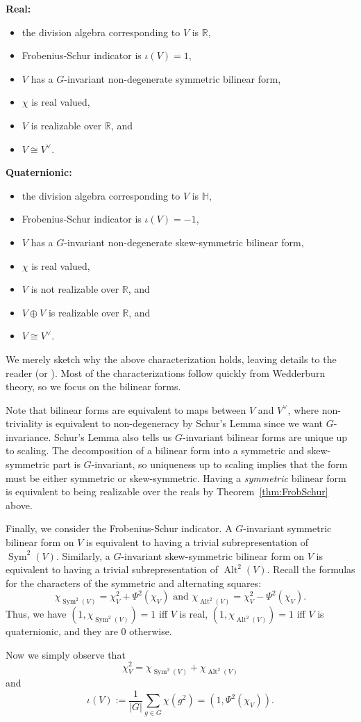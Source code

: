 \documentclass[12pt]{article}
\theoremstyle{plain}
\theoremstyle{definition}
\theoremstyle{remark}
\numberwithin{equation}{section}
\begin{document}
\noindent
\textbf{Real:}
\begin{itemize}
\item the division algebra corresponding to $V$ is $\mathbb{R}$,
\item Frobenius-Schur indicator is $\iota(V)=1$,
\item $V$ has a $G$-invariant non-degenerate symmetric bilinear form,
\item $\chi$ is real valued,
\item $V$ is realizable over $\mathbb{R}$, and
\item $V \cong V^\vee$.
\end{itemize}

\noindent
\textbf{Quaternionic:}
\begin{itemize}
\item the division algebra corresponding to $V$ is $\mathbb{H}$,
\item Frobenius-Schur indicator is $\iota(V)=-1$,
\item $V$ has a $G$-invariant non-degenerate skew-symmetric bilinear form,
\item $\chi$ is real valued,
\item $V$ is not realizable over $\mathbb{R}$, and
\item $V \oplus V$ is realizable over $\mathbb{R}$, and
\item $V \cong V^\vee$.
\end{itemize}

We merely sketch why the above characterization holds,
leaving details to the reader (or \cite[\S{13.2}]{Serre}).
Most of the characterizations follow quickly from Wedderburn theory,
so we focus on the bilinear forms.

Note that bilinear forms are equivalent to maps between $V$ and
$V^\vee$, where non-triviality is equivalent to non-degeneracy by
Schur's Lemma since we want $G$-invariance.
Schur's Lemma also tells us $G$-invariant bilinear forms
are unique up to scaling.
The decomposition of a bilinear form into a symmetric and skew-symmetric
part is $G$-invariant, so uniqueness up to scaling implies that the form
must be either symmetric or skew-symmetric.
Having a \emph{symmetric} bilinear form is equivalent to being realizable over
the reals by Theorem~\ref{thm:FrobSchur} above.

Finally, we consider the Frobenius-Schur indicator.
A $G$-invariant symmetric bilinear form on $V$ is equivalent to
having a trivial subrepresentation of $\operatorname{Sym}^2(V)$.
Similarly, a $G$-invariant skew-symmetric bilinear form on $V$
is equivalent to having a trivial subrepresentation of
$\operatorname{Alt}^2(V)$.
Recall the formulas for the characters of the
symmetric and alternating squares:
\[
\chi_{\operatorname{Sym}^2(V)} = \chi_V^2 + \Psi^2(\chi_V)
\textrm{ and }
\chi_{\operatorname{Alt}^2(V)} = \chi_V^2 - \Psi^2(\chi_V).
\]
Thus, we have $(1,\chi_{\operatorname{Sym}^2(V)})=1$ iff $V$ is real,
$(1,\chi_{\operatorname{Alt}^2(V)})=1$ iff $V$ is quaternionic,
and they are $0$ otherwise.

Now we simply observe that
\[
\chi_V^2 = \chi_{\operatorname{Sym}^2(V)} + \chi_{\operatorname{Alt}^2(V)}
\]
and
\[
\iota(V) := \frac{1}{|G|}\sum_{g \in G} \chi(g^2)
=(1, \Psi^2(\chi_V)).
\]



\end{document}
